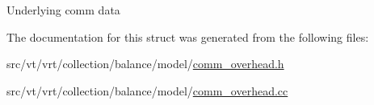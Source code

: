 Underlying comm data 

The documentation for this struct was generated from the following files\+:\begin{DoxyCompactItemize}
\item 
src/vt/vrt/collection/balance/model/\hyperlink{comm__overhead_8h}{comm\+\_\+overhead.\+h}\item 
src/vt/vrt/collection/balance/model/\hyperlink{comm__overhead_8cc}{comm\+\_\+overhead.\+cc}\end{DoxyCompactItemize}
